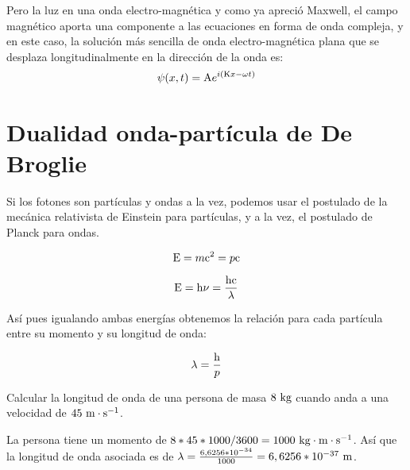 Pero la luz en una onda electro-magnética y como ya apreció Maxwell, el campo magnético aporta una componente a las ecuaciones en forma de onda compleja, y en este caso, la solución más sencilla de onda electro-magnética plana que se desplaza longitudinalmente en la dirección de la onda es:
\begin{equation}
    \label{eq:solucion-ecuacion-ondas-complejas-simple}
    \psi(x,t)=\mathrm{A} e^{i(\mathrm{K} x - \omega t)}
\end{equation}


\section{Dualidad onda-partícula de De Broglie}\label{sec:dualidad-onda-partícula-de-de-broglie}

Si los fotones son partículas y ondas a la vez, podemos usar el postulado de la mecánica relativista de Einstein para partículas, y a la vez, el postulado de Planck para ondas.

\begin{postulate}
    \begin{equation}
        \label{eq:energia-einstein}
        \mathrm{E}=m{\mathrm{c}}^2=p\mathrm{c}
    \end{equation}
\end{postulate}

\begin{postulate}
    \begin{equation}
        \label{eq:energia-planck}
        \mathrm{E}=\mathrm{h}\nu=\frac{\mathrm{h}\mathrm{c}}{\lambda}
    \end{equation}
\end{postulate}

Así pues igualando ambas energías obtenemos la relación para cada partícula entre su momento y su longitud de onda:
\begin{postulate}
    \begin{equation}
        \label{eq:dualidad-de-broglie}
        \lambda=\frac{\mathrm{h}}{p}
    \end{equation}
\end{postulate}

\begin{example}
    Calcular la longitud de onda de una persona de masa $8\ \mathrm{kg}$ cuando anda a una velocidad de $45\ \mathrm{m}\cdot\mathrm{s}^{-1}$.

    La persona tiene un momento de $8*45*1000/3600=1000\ \mathrm{kg}\cdot\mathrm{m}\cdot\mathrm{s}^{-1}$.
    Así que la longitud de onda asociada es de $\lambda=\frac{6,6256*10^{-34}}{1000}=6,6256*10^{-37}\ \mathrm{m}$.
\end{example}


